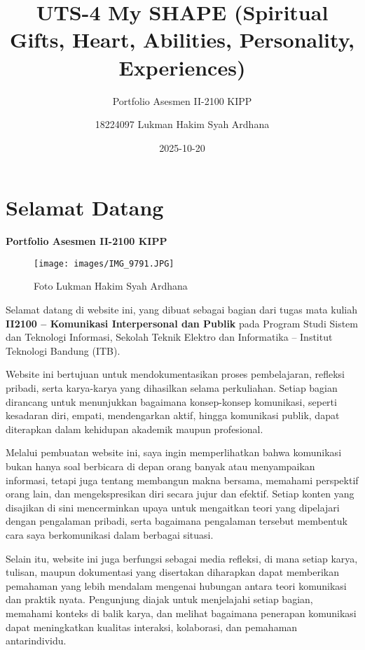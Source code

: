 \documentclass[
  letterpaper,
  DIV=11,
  numbers=noendperiod]{scrreprt}
\title{UTS-4 My SHAPE (Spiritual Gifts, Heart, Abilities, Personality,
Experiences)}
\subtitle{Portfolio Asesmen II-2100 KIPP}
\author{18224097 Lukman Hakim Syah Ardhana}
\date{2025-10-20}
\renewcommand*\contentsname{Table of contents}
\newcommand\contentsname{Table of contents}
\begin{document}
\maketitle

\renewcommand*\contentsname{Table of contents}
{
\hypersetup{linkcolor=}
\setcounter{tocdepth}{2}
\tableofcontents
}


\chapter*{Selamat Datang}\label{selamat-datang}


\textbf{Portfolio Asesmen II-2100 KIPP}

\begin{figure}[H]

{\centering \texttt{[image: images/IMG\_9791.JPG]}

}

\caption{Foto Lukman Hakim Syah Ardhana}

\end{figure}%

Selamat datang di website ini, yang dibuat sebagai bagian dari tugas
mata kuliah \textbf{II2100 -- Komunikasi Interpersonal dan Publik} pada
Program Studi Sistem dan Teknologi Informasi, Sekolah Teknik Elektro dan
Informatika -- Institut Teknologi Bandung (ITB).

Website ini bertujuan untuk mendokumentasikan proses pembelajaran,
refleksi pribadi, serta karya-karya yang dihasilkan selama perkuliahan.
Setiap bagian dirancang untuk menunjukkan bagaimana konsep-konsep
komunikasi, seperti kesadaran diri, empati, mendengarkan aktif, hingga
komunikasi publik, dapat diterapkan dalam kehidupan akademik maupun
profesional.

Melalui pembuatan website ini, saya ingin memperlihatkan bahwa
komunikasi bukan hanya soal berbicara di depan orang banyak atau
menyampaikan informasi, tetapi juga tentang membangun makna bersama,
memahami perspektif orang lain, dan mengekspresikan diri secara jujur
dan efektif. Setiap konten yang disajikan di sini mencerminkan upaya
untuk mengaitkan teori yang dipelajari dengan pengalaman pribadi, serta
bagaimana pengalaman tersebut membentuk cara saya berkomunikasi dalam
berbagai situasi.

Selain itu, website ini juga berfungsi sebagai media refleksi, di mana
setiap karya, tulisan, maupun dokumentasi yang disertakan diharapkan
dapat memberikan pemahaman yang lebih mendalam mengenai hubungan antara
teori komunikasi dan praktik nyata. Pengunjung diajak untuk menjelajahi
setiap bagian, memahami konteks di balik karya, dan melihat bagaimana
penerapan komunikasi dapat meningkatkan kualitas interaksi, kolaborasi,
dan pemahaman antarindividu.
\end{document}
